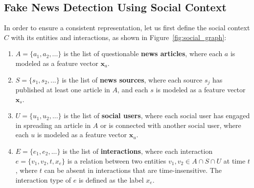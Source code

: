 \documentclass[sigconf,anonymous]{acmart}
\theoremstyle{definition}
\theoremstyle{hypothesis}
\begin{document}
\subsection{Fake News Detection Using Social Context}
In order to ensure a consistent representation, let us first define the social context $C$ with 
its entities and interactions, as shown in Figure~\ref{fig:social_graph}:
\begin{enumerate}
    \item $A=\{a_1, a_2,...\}$ is the list of questionable \textbf{news articles}, where each $a$ is modeled as a feature vector $\boldsymbol{x}_{a}$.
    \item $S=\{s_1, s_2,...\}$ is the list of \textbf{news sources}, where each source $s_j$ has published at least one article in $A$, and each $s$ is modeled as a feature vector $\boldsymbol{x}_{s}$.
    \item $U=\{u_1, u_2,...\}$ is the list of \textbf{social users}, where each social user has engaged in spreading an article in $A$ or is connected with another social user, where each $u$ is modeled as a feature vector $\boldsymbol{x}_{u}$.
    \item $E=\{e_1, e_2,...\}$ is the list of
    {\bf interactions}, where each interaction $e=\{v_1, v_2, t, x_e\}$ is a relation between two entities $v_1, v_2\in A\cap S\cap U$ at time $t$, where $t$ can be absent in interactions that are time-insensitive. The interaction type of $e$ is defined as the label $x_{e}$.
\end{enumerate}
\end{document}
